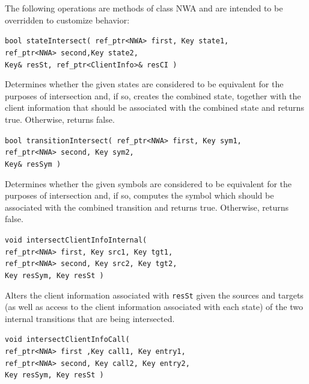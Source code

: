 \documentclass{llncs}
\begin{document}
\noindent The following operations are methods of class NWA and are intended to be overridden to customize behavior:

\begin{description}

  \item\texttt{bool stateIntersect( ref\_ptr<NWA> first, Key state1,\\ \hspace*{3.25cm} ref\_ptr<NWA> second,Key state2,\\ \hspace*{3.25cm} Key\& resSt, ref\_ptr<ClientInfo>\& resCI )} \nopagebreak

    Determines whether the given states are considered to be equivalent for the purposes of intersection and, if so, creates the combined state, together with the client information that should be associated with the combined state and returns true.  Otherwise, returns false.
    
  \item\texttt{bool transitionIntersect( ref\_ptr<NWA> first, Key sym1,\\ \hspace*{3.25cm} ref\_ptr<NWA> second, Key sym2,\\ \hspace*{3.25cm} Key\& resSym )} \nopagebreak

    Determines whether the given symbols are considered to be equivalent for the purposes of intersection and, if so, computes the symbol which should be associated with the combined transition and returns true.  Otherwise, returns false. 

  \item\texttt{void intersectClientInfoInternal( \\ \hspace*{3.25cm} ref\_ptr<NWA> first, Key src1, Key tgt1,\\ \hspace*{3.25cm} ref\_ptr<NWA> second, Key src2, Key tgt2,\\ \hspace*{3.25cm} Key resSym, Key resSt )} \nopagebreak

    Alters the client information associated with \texttt{resSt} given the sources and targets (as well as access to the client information associated with each state) of the two internal transitions that are being intersected.

  \item\texttt{void intersectClientInfoCall( \\ \hspace*{3.25cm} ref\_ptr<NWA> first ,Key call1, Key entry1,\\ \hspace*{3.25cm} ref\_ptr<NWA> second, Key call2, Key entry2,\\ \hspace*{3.25cm} Key resSym, Key resSt )} \nopagebreak


\end{description}
\end{document}
